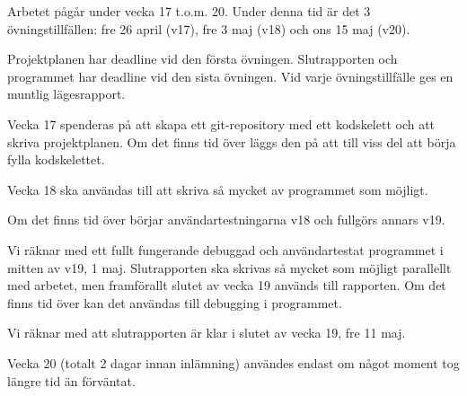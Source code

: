 Arbetet pågår under vecka 17 t.o.m. 20.
Under denna tid är det 3 övningstillfällen:
fre 26 april (v17),
fre 3 maj (v18) och
ons 15 maj (v20).

Projektplanen har deadline vid den första övningen.
Slutrapporten och programmet har deadline vid den sista övningen.
Vid varje övningstillfälle ges en muntlig lägesrapport.

Vecka 17 spenderas på att skapa ett git-repository med ett kodskelett och
att skriva projektplanen.
Om det finns tid över läggs den på att till viss del att börja
fylla kodskelettet.

Vecka 18 ska användas till att skriva så mycket av programmet som möjligt.

Om det finns tid över börjar användartestningarna v18 och fullgörs annars
v19.

Vi räknar med ett fullt fungerande debuggad och användartestat
programmet i mitten av v19, 1 maj.
Slutrapporten ska skrivas så mycket som möjligt parallellt
med arbetet, men framförallt slutet av vecka 19 används till rapporten.
Om det finns tid över kan det användas till debugging i programmet.

Vi räknar med att slutrapporten är klar i slutet av vecka 19, fre 11 maj.

Vecka 20 (totalt 2 dagar innan inlämning) användes endast om något
moment tog längre tid än förväntat.
